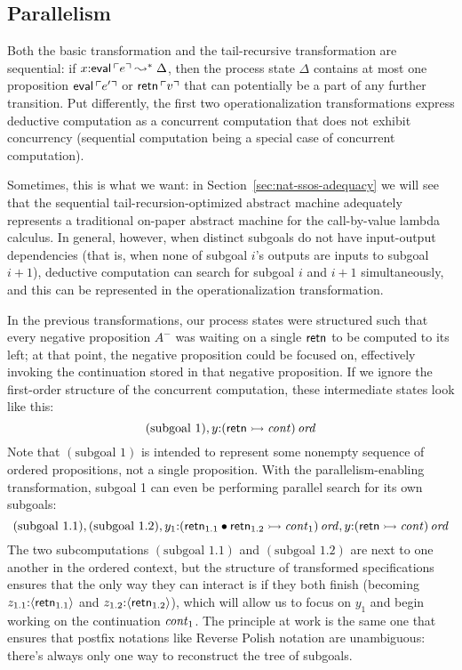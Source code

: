 \subsection{Parallelism}
\label{sec:trans-par}

Both the basic transformation and the tail-recursive transformation
are sequential: if $x{:}{\sf eval}\,{\ulcorner{e}\urcorner} \leadsto^* \Delta$,
then the process state $\Delta$ contains at most one proposition ${\sf
  eval}\,{\ulcorner{e'}\urcorner}$ or ${\sf retn}\,{\ulcorner{v}\urcorner}$ that can potentially
be a part of any further transition. Put differently, the first two
operationalization transformations express deductive computation as a
concurrent computation that does not exhibit concurrency (sequential
computation being a special case of concurrent computation).

Sometimes, this is what we want: in
Section~\ref{sec:nat-ssos-adequacy} we will see that the sequential
tail-recursion-optimized abstract machine 
adequately represents a traditional on-paper abstract machine for
the call-by-value lambda calculus. In general, however, when distinct
subgoals do not have input-output dependencies (that is, when none of
subgoal $i$'s outputs are inputs to subgoal $i+1$), deductive computation
can search for subgoal $i$ and $i+1$ simultaneously, and this can 
be represented in the operationalization transformation.

In the previous transformations, our process states were structured
such that every negative proposition $A^-$ was waiting on a single
${\sf retn}$ to be computed to its left; at that point, the negative
proposition could be focused on, effectively invoking the
continuation stored in that negative proposition. If we ignore the
first-order structure of the concurrent computation, these
intermediate states look like this:
\[
  (\mbox{subgoal 1}), y{:}{({\sf retn} \rightarrowtail {\it cont})}\,{{\it ord}}
\]
Note that $(\mbox{subgoal 1})$ is intended to represent some nonempty
sequence of ordered propositions, not a single proposition. With the
parallelism-enabling transformation, subgoal 1 can even be performing
parallel search for its own subgoals:
\[
 (\mbox{subgoal 1.1}), (\mbox{subgoal 1.2}), 
   y_1{:}{({\sf retn}_{1.1} \mathbin{\bullet} {\sf retn}_{1.2} \rightarrowtail {\it cont}_1)}\,{{\it ord}}, 
   y{:}{({\sf retn} \rightarrowtail {\it cont})}\,{{\it ord}}
\]
The two subcomputations $(\mbox{subgoal 1.1})$ and $(\mbox{subgoal
  1.2})$ are next to one another in the ordered context, but the
structure of transformed specifications ensures that the only way they
can interact is if they both finish (becoming $z_{1.1}{:}\langle {{\sf
    retn}_{1.1}} \rangle$ and $z_{1.2}{:}\langle {{\sf retn}_{1.2}} \rangle$), which will
allow us to focus on $y_1$ and begin working on the continuation ${\it
  cont}_1$. The principle at work is the same one that ensures that postfix
notations like Reverse Polish notation are unambiguous: there's always
only one way to reconstruct the tree of subgoals. 

